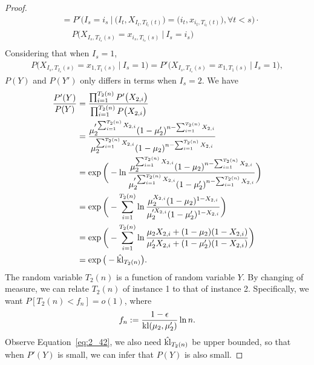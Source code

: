 \begin{proof}
\begin{equation}
\begin{split}
            &=P'\Big(I_s=i_s~\Big|~
            \big(I_t, X_{I_t, T_{I_t}(t)}\big)=\big(i_t, x_{i_t, T_{i_t}(t)}\big), \forall t<s\Big) \cdot \\
            &\quad~P\Big(X_{I_s, T_{I_s}(s)}=x_{i_s, T_{i_s}(s)}~\Big|~I_s=i_s\Big) \\
        \end{split}
    \end{equation}
    Considering that when $I_s=1$,
    \begin{align}
        P\Big(X_{I_s, T_{I_s}(s)}=x_{1, T_{1}(s)}~\Big|~I_s=1\Big) = P'\Big(X_{I_s, T_{I_s}(s)}=x_{1, T_{1}(s)}~\Big|~I_s=1\Big),
    \end{align}
    $P(Y)$ and $P(Y')$ only differs in terms when $I_s=2$.
    We have
    \begin{align}
        \frac{P'(Y)}{P(Y)}
            &= \frac{\prod_{i=1}^{T_2(n)}P'\big(X_{2, i}\big)}{\prod_{i=1}^{T_2(n)}P\big(X_{2, i}\big)} \\
            &= \frac{\mu_2'^{\sum_{i=1}^{T_2(n)} X_{2,i}}(1-\mu_2')^{n-\sum_{i=1}^{T_2(n)} X_{2,i}}}
                {\mu_2^{\sum_{i=1}^{T_2(n)} X_{2,i}}(1-\mu_2)^{n-\sum_{i=1}^{T_2(n)} X_{2,i}}} \\
            &= \exp\bigg(-\ln
                \frac{\mu_2^{\sum_{i=1}^{T_2(n)} X_{2,i}}(1-\mu_2)^{n-\sum_{i=1}^{T_2(n)} X_{2,i}}}
                {\mu_2'^{\sum_{i=1}^{T_2(n)} X_{2,i}}(1-\mu_2')^{n-\sum_{i=1}^{T_2(n)} X_{2,i}}}\bigg) \\
            &= \exp\bigg(-\sum_{i=1}^{T_2(n)} \ln
                \frac{\mu_2^{X_{2,i}}(1-\mu_2)^{1-X_{2,i}}}
                {\mu_2'^{X_{2,i}}(1-\mu_2')^{1-X_{2,i}}}\bigg) \\
            &= \exp\bigg(-\sum_{i=1}^{T_2(n)} \ln
                \frac{\mu_2 X_{2,i} + (1-\mu_2) (1-X_{2,i})}
                {\mu_2' X_{2,i} + (1-\mu_2')(1-X_{2,i})}\bigg) \\
            &= \exp\big(-\hat{{\mathop{\mathrm{kl}}}}_{T_2(n)}\big).\label{eq:2_42}
    \end{align}
    The random variable $T_2(n)$ is a function of random variable $Y$.
    By changing of measure,
    we can relate $T_2(n)$ of instance 1 to that of instance 2.
    Specifically, we want $P[T_2(n)<f_n]=o(1)$, where
    \begin{equation}
        f_n:=\frac{1-\epsilon}{{\mathop{\mathrm{kl}}}(\mu_2,\mu_2')}\ln n.
    \end{equation}
    Observe Equation~\eqref{eq:2_42}, we also need $\hat{{\mathop{\mathrm{kl}}}}_{T_2(n)}$ be upper bounded,
    so that when $P'(Y)$ is small, we can infer that $P(Y)$ is also small.

\end{proof}
